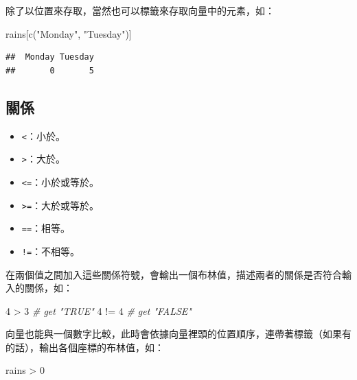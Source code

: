 \documentclass[
]{book}
\newenvironment{Shaded}{\begin{snugshade}}{\end{snugshade}}
\newcommand{\CommentTok}[1]{\textcolor[rgb]{0.56,0.35,0.01}{\textit{#1}}}
\newcommand{\DecValTok}[1]{\textcolor[rgb]{0.00,0.00,0.81}{#1}}
\newcommand{\FunctionTok}[1]{\textcolor[rgb]{0.00,0.00,0.00}{#1}}
\newcommand{\NormalTok}[1]{#1}
\newcommand{\SpecialCharTok}[1]{\textcolor[rgb]{0.00,0.00,0.00}{#1}}
\newcommand{\StringTok}[1]{\textcolor[rgb]{0.31,0.60,0.02}{#1}}
\providecommand{\tightlist}{%
  \setlength{\itemsep}{0pt}\setlength{\parskip}{0pt}}
\theoremstyle{definition}
\theoremstyle{remark}
\begin{document}
除了以位置來存取，當然也可以標籤來存取向量中的元素，如：

\begin{Shaded}
\begin{Highlighting}[]
\NormalTok{rains[}\FunctionTok{c}\NormalTok{(}\StringTok{"Monday"}\NormalTok{, }\StringTok{"Tuesday"}\NormalTok{)]}
\end{Highlighting}
\end{Shaded}

\begin{verbatim}
##  Monday Tuesday 
##       0       5
\end{verbatim}

\hypertarget{ux95dcux4fc2}{%
\subsection{關係}\label{ux95dcux4fc2}}

\begin{itemize}
\tightlist
\item
  \texttt{\textless{}}：小於。
\item
  \texttt{\textgreater{}}：大於。
\item
  \texttt{\textless{}=}：小於或等於。
\item
  \texttt{\textgreater{}=}：大於或等於。
\item
  \texttt{==}：相等。
\item
  \texttt{!=}：不相等。
\end{itemize}

在兩個值之間加入這些關係符號，會輸出一個布林值，描述兩者的關係是否符合輸入的關係，如：

\begin{Shaded}
\begin{Highlighting}[]
\DecValTok{4} \SpecialCharTok{\textgreater{}} \DecValTok{3}  \CommentTok{\# get "TRUE"}
\DecValTok{4} \SpecialCharTok{!=} \DecValTok{4}  \CommentTok{\# get "FALSE"}
\end{Highlighting}
\end{Shaded}

向量也能與一個數字比較，此時會依據向量裡頭的位置順序，連帶著標籤（如果有的話），輸出各個座標的布林值，如：

\begin{Shaded}
\begin{Highlighting}[]
\NormalTok{rains }\SpecialCharTok{\textgreater{}} \DecValTok{0}
\end{Highlighting}
\end{Shaded}
\end{document}
